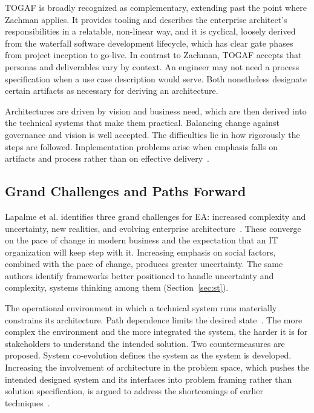 \documentclass{csimq}
\begin{document}
TOGAF is broadly recognized as complementary, extending past the point where
Zachman applies. It provides tooling and describes the enterprise architect's
responsibilities in a relatable, non-linear way, and it is cyclical, loosely
derived from the waterfall software development lifecycle, which has clear gate
phases from project inception to go-live. In contrast to Zachman, TOGAF accepts
that personas and deliverables vary by context. An engineer may not need a
process specification when a use case description would serve. Both nonetheless
designate certain artifacts as necessary for deriving an architecture.

Architectures are driven by vision and business need, which are then derived
into the technical systems that make them practical. Balancing change against
governance and vision is well accepted. The difficulties lie in how rigorously
the steps are followed. Implementation problems arise when emphasis falls on
artifacts and process rather than on effective delivery~\cite{bente2012}.

\subsection{Grand Challenges and Paths Forward}

Lapalme et al. identifies three grand challenges for EA: increased complexity and
uncertainty, new realities, and evolving enterprise
architecture~\cite{lapalme2016}. These converge on the pace of change in modern
business and the expectation that an IT organization will keep step with it.
Increasing emphasis on social factors, combined with the pace of change,
produces greater uncertainty. The same authors identify frameworks better
positioned to handle uncertainty and complexity, systems thinking among them
(Section~\ref{sec:st}).

The operational environment in which a technical system runs materially
constrains its architecture. Path dependence limits the desired
state~\cite{gong2019}. The more complex the environment and the more integrated
the system, the harder it is for stakeholders to understand the intended
solution. Two countermeasures are proposed. System co-evolution defines
the system as the system is developed. Increasing the involvement of
architecture in the problem space, which pushes the intended designed system and
its interfaces into problem framing rather than solution specification, is
argued to address the shortcomings of earlier techniques~\cite{cole2006}.
\end{document}

